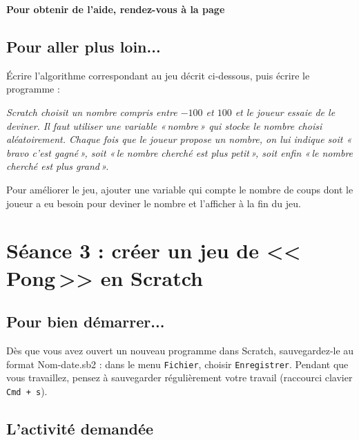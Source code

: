 \textbf{Pour obtenir de l'aide, rendez-vous à la page \pageref{aide_seanceScratch2}}




\subsection{Pour aller plus loin...}

Écrire l'algorithme correspondant au jeu décrit ci-dessous, puis écrire le programme :

\vspace{6pt}

\emph{Scratch choisit un nombre compris entre $-100$ et $100$ et le joueur essaie de le deviner. Il faut utiliser une variable «\,nombre\,» qui stocke le nombre choisi aléatoirement. Chaque fois que le joueur propose un nombre, on lui indique soit «\,bravo c'est gagné\,», soit «\,le nombre cherché est plus petit\,», soit enfin «\,le nombre cherché est plus grand\,».}

\vspace{6pt}

Pour améliorer le jeu, ajouter une variable qui compte le nombre de coups dont le joueur a eu besoin pour deviner le nombre et l'afficher à la fin du jeu.

\newpage

%
%
%
%




\section{Séance 3 : créer un jeu de <<\,Pong\,>> en Scratch}\label{ficheScratch5e3}


\subsection{Pour bien démarrer...}

Dès que vous avez ouvert un nouveau programme dans Scratch, sauvegardez-le au format Nom-date.sb2 : dans le menu \texttt{Fichier}, choisir \texttt{Enregistrer}. Pendant que vous travaillez, pensez à sauvegarder régulièrement votre travail (raccourci clavier \texttt{Cmd + s}).   


\subsection{L'activité demandée}

